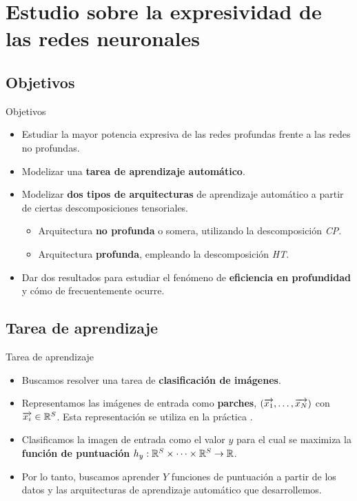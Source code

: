 \section{Estudio sobre la expresividad de las redes neuronales}

\subsection{Objetivos}
\begin{frame}{Objetivos}
	\begin{itemize}
		\item Estudiar la mayor potencia expresiva de las redes profundas frente a las redes no profundas.
		\item Modelizar una \textbf{tarea de aprendizaje automático}.
		\item Modelizar \textbf{dos tipos de arquitecturas} de aprendizaje automático a partir de ciertas descomposiciones tensoriales.
		      \begin{itemize}
			      \item Arquitectura \textbf{no profunda} o somera, utilizando la descomposición \textit{CP}.
			      \item Arquitectura \textbf{profunda}, empleando la descomposición \textit{HT}.
		      \end{itemize}
		\item Dar dos resultados para estudiar el fenómeno de \textbf{eficiencia en profundidad} y cómo de frecuentemente ocurre.
	\end{itemize}
\end{frame}

\subsection{Tarea de aprendizaje}
\begin{frame}{Tarea de aprendizaje}

	\begin{itemize}
		\item Buscamos resolver una tarea de \textbf{clasificación de imágenes}.
		\item Representamos las imágenes de entrada como \textbf{parches}, $(\overrightarrow{x_1}, \ldots, \overrightarrow{x_N})$ con $\overrightarrow{x_i} \in \mathbb{R}^S$. Esta representación se utiliza en la práctica \cite{matematicas:vit}.
		\item Clasificamos la imagen de entrada como el valor $y$ para el cual se maximiza la \textbf{función de puntuación} $h_y: \mathbb{R}^S \times \cdots \times \mathbb{R}^S \to \mathbb{R}$.
		\item Por lo tanto, buscamos aprender $Y$ funciones de puntuación a partir de los datos y las arquitecturas de aprendizaje automático que desarrollemos.
	\end{itemize}

\end{frame}

